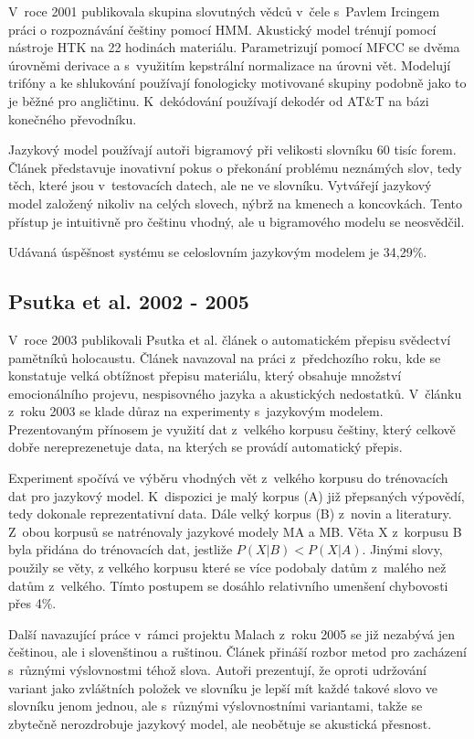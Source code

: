 V~roce 2001 publikovala skupina slovutných vědců v~čele s~Pavlem Ircingem práci
o rozpoznávání češtiny pomocí HMM\cite{ircing2001large}. Akustický model trénují
pomocí nástroje HTK na 22 hodinách materiálu. Parametrizují pomocí MFCC se dvěma
úrovněmi derivace a s~využitím kepstrální normalizace na úrovni vět. Modelují
trifóny a ke shlukování používají fonologicky motivované skupiny podobně jako to
je běžné pro angličtinu. K~dekódování používají dekodér od AT\&T na bázi
konečného převodníku\cite{mohri2002weighted}.

Jazykový model používají autoři bigramový při velikosti slovníku 60 tisíc forem.
Článek představuje inovativní pokus o překonání problému neznámých slov, tedy
těch, které jsou v~testovacích datech, ale ne ve slovníku. Vytvářejí jazykový
model založený nikoliv na celých slovech, nýbrž na kmenech a koncovkách. Tento
přístup je intuitivně pro češtinu vhodný, ale u bigramového modelu se
neosvědčil.

Udávaná úspěšnost systému se celoslovním jazykovým modelem je 34,29\%.

\subsection{Psutka et al. 2002 - 2005}

V~roce 2003 publikovali Psutka et al. článek o automatickém přepisu svědectví
pamětníků holocaustu\cite{psutka2003large}. Článek navazoval na práci
z~předchozího roku\cite{psutka2002automatic}, kde se konstatuje velká obtížnost
přepisu materiálu, který obsahuje množství emocionálního projevu, nespisovného
jazyka a akustických nedostatků. V~článku z~roku 2003 se klade důraz na
experimenty s~jazykovým modelem. Prezentovaným přínosem je využití dat z~velkého
korpusu češtiny, který celkově dobře nereprezenetuje data, na kterých se provádí
automatický přepis.

Experiment spočívá ve výběru vhodných vět z~velkého korpusu do trénovacích dat
pro jazykový model. K~dispozici je malý korpus (A) již přepsaných výpovědí, tedy
dokonale reprezentativní data. Dále velký korpus (B) z~novin a literatury.
Z~obou korpusů se natrénovaly jazykové modely MA a MB. Věta X z~korpusu B byla
přidána do trénovacích dat, jestliže $P(X|B) < P(X|A)$. Jinými slovy, použily se
věty, z velkého korpusu které se více podobaly datům z~malého než datům
z~velkého. Tímto postupem se dosáhlo relativního umenšení chybovosti přes 4\%.

Další navazující práce v~rámci projektu Malach\cite{psutka2005automatic} z~roku
2005 se již nezabývá jen češtinou, ale i slovenštinou a ruštinou. Článek
přináší rozbor metod pro zacházení s~různými výslovnostmi téhož slova. Autoři
prezentují, že oproti udržování variant jako zvláštních položek ve slovníku je
lepší mít každé takové slovo ve slovníku jenom jednou, ale s~různými
výslovnostními variantami, takže se zbytečně nerozdrobuje jazykový model, ale
neobětuje se akustická přesnost.

